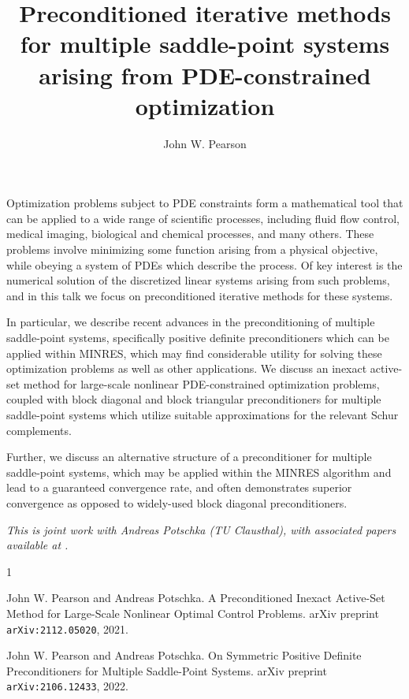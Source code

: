 \documentclass[a4paper]{amsart}
\date{}
\begin{document}
\title{Preconditioned iterative methods for multiple saddle-point systems arising from PDE-constrained optimization}
\author{John W. Pearson} %
\address{University of Edinburgh} %

\maketitle


Optimization problems subject to PDE constraints form a mathematical tool that can be applied to a wide range of scientific processes, including fluid flow control, medical imaging, biological and chemical processes, and many others. These problems involve minimizing some function arising from a physical objective, while obeying a system of PDEs which describe the process. Of key interest is the numerical solution of the discretized linear systems arising from such problems, and in this talk we focus on preconditioned iterative methods for these systems.

In particular, we describe recent advances in the preconditioning of multiple saddle-point systems, specifically positive definite preconditioners which can be applied within MINRES, which may find considerable utility for solving these optimization problems as well as other applications. We discuss an inexact active-set method for large-scale nonlinear PDE-constrained optimization problems, coupled with block diagonal and block triangular preconditioners for multiple saddle-point systems which utilize suitable approximations for the relevant Schur complements.

Further, we discuss an alternative structure of a preconditioner for multiple saddle-point systems, which may be applied within the MINRES algorithm and lead to a guaranteed convergence rate, and often demonstrates superior convergence as opposed to widely-used block diagonal preconditioners.

\emph{This is joint work with Andreas Potschka (TU Clausthal), with associated papers available at \cite{PP1,PP2}.}

\begin{thebibliography}{1}

John W. Pearson and Andreas Potschka.
\newblock A Preconditioned Inexact Active-Set Method for Large-Scale Nonlinear Optimal Control Problems.
\newblock arXiv preprint \texttt{arXiv:2112.05020}, 2021.

John W. Pearson and Andreas Potschka.
\newblock On Symmetric Positive Definite Preconditioners for Multiple Saddle-Point Systems.
\newblock arXiv preprint \texttt{arXiv:2106.12433}, 2022.

\end{thebibliography}
\end{document}
